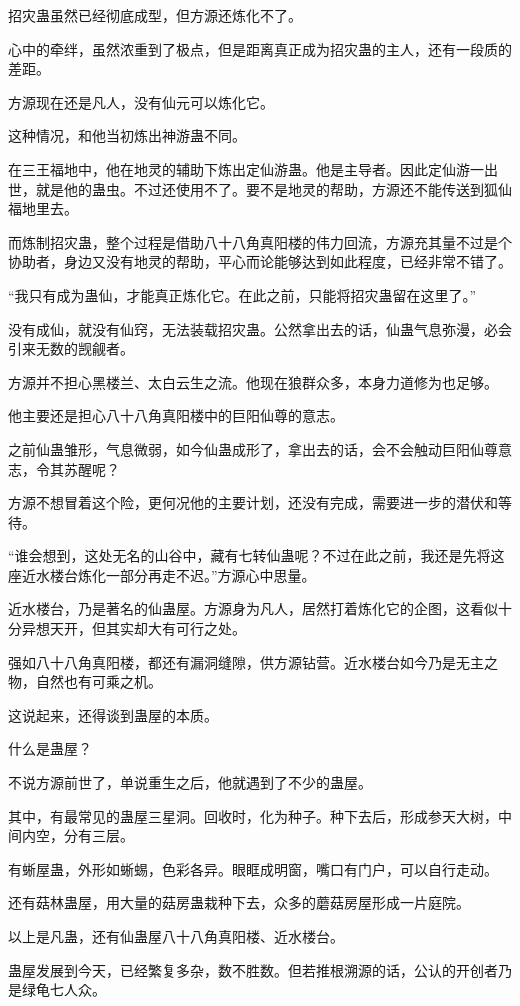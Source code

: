\begin{this_body}
招灾蛊虽然已经彻底成型，但方源还炼化不了。

心中的牵绊，虽然浓重到了极点，但是距离真正成为招灾蛊的主人，还有一段质的差距。

方源现在还是凡人，没有仙元可以炼化它。

这种情况，和他当初炼出神游蛊不同。

在三王福地中，他在地灵的辅助下炼出定仙游蛊。他是主导者。因此定仙游一出世，就是他的蛊虫。不过还使用不了。要不是地灵的帮助，方源还不能传送到狐仙福地里去。

而炼制招灾蛊，整个过程是借助八十八角真阳楼的伟力回流，方源充其量不过是个协助者，身边又没有地灵的帮助，平心而论能够达到如此程度，已经非常不错了。

“我只有成为蛊仙，才能真正炼化它。在此之前，只能将招灾蛊留在这里了。”

没有成仙，就没有仙窍，无法装载招灾蛊。公然拿出去的话，仙蛊气息弥漫，必会引来无数的觊觎者。

方源并不担心黑楼兰、太白云生之流。他现在狼群众多，本身力道修为也足够。

他主要还是担心八十八角真阳楼中的巨阳仙尊的意志。

之前仙蛊雏形，气息微弱，如今仙蛊成形了，拿出去的话，会不会触动巨阳仙尊意志，令其苏醒呢？

方源不想冒着这个险，更何况他的主要计划，还没有完成，需要进一步的潜伏和等待。

“谁会想到，这处无名的山谷中，藏有七转仙蛊呢？不过在此之前，我还是先将这座近水楼台炼化一部分再走不迟。”方源心中思量。

近水楼台，乃是著名的仙蛊屋。方源身为凡人，居然打着炼化它的企图，这看似十分异想天开，但其实却大有可行之处。

强如八十八角真阳楼，都还有漏洞缝隙，供方源钻营。近水楼台如今乃是无主之物，自然也有可乘之机。

这说起来，还得谈到蛊屋的本质。

什么是蛊屋？

不说方源前世了，单说重生之后，他就遇到了不少的蛊屋。

其中，有最常见的蛊屋三星洞。回收时，化为种子。种下去后，形成参天大树，中间内空，分有三层。

有蜥屋蛊，外形如蜥蜴，色彩各异。眼眶成明窗，嘴口有门户，可以自行走动。

还有菇林蛊屋，用大量的菇房蛊栽种下去，众多的蘑菇房屋形成一片庭院。

以上是凡蛊，还有仙蛊屋八十八角真阳楼、近水楼台。

蛊屋发展到今天，已经繁复多杂，数不胜数。但若推根溯源的话，公认的开创者乃是绿龟七人众。


\end{this_body}
